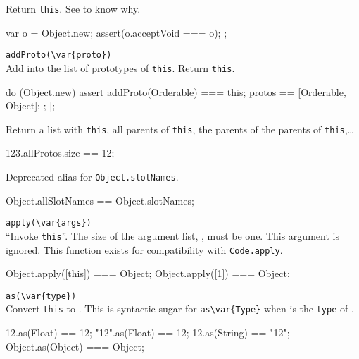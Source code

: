 \begin{urbiscriptapi}
\item[acceptVoid]
  Return \lstinline|this|.  See  to know why.
\begin{urbiscript}
{
  var o = Object.new;
  assert(o.acceptVoid === o);
};
\end{urbiscript}


\item \lstinline|addProto(\var{proto})|\\
  Add  into the list of prototypes of \lstinline|this|.
  Return \lstinline|this|.
\begin{urbiscript}
do (Object.new)
{
  assert
  {
    addProto(Orderable) === this;
    protos == [Orderable, Object];
  };
}|;
\end{urbiscript}

\item[allProto]
  Return a list with \lstinline|this|, all parents of
  \lstinline|this|, the parents of the parents of
  \lstinline|this|,\ldots
\begin{urbiassert}
123.allProtos.size == 12;
\end{urbiassert}

\item[allSlotNames]
  Deprecated alias for \lstinline|Object.slotNames|.
\begin{urbiassert}
Object.allSlotNames == Object.slotNames;
\end{urbiassert}

\item \lstinline|apply(\var{args})|\\
  ``Invoke \lstinline|this|''.  The size of the argument list,
  , must be one.  This argument is ignored.  This function
  exists for compatibility with \lstinline|Code.apply|.
\begin{urbiassert}
Object.apply([this]) === Object;
Object.apply([1])    === Object;
\end{urbiassert}

\item \lstinline|as(\var{type})|\\
  Convert \lstinline|this| to .  This is syntactic sugar for
  \lstinline|as\var{Type}| when  is the \lstinline|type| of
  .
\begin{urbiassert}
12.as(Float) == 12;
"12".as(Float) == 12;
12.as(String) == "12";
Object.as(Object) === Object;
\end{urbiassert}


\end{urbiscriptapi}
